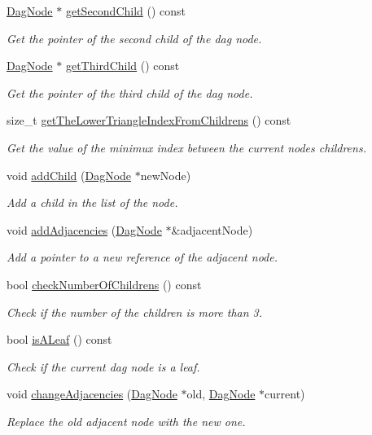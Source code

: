 \begin{DoxyCompactItemize}
\hyperlink{classDagNode}{Dag\+Node} $\ast$ \hyperlink{classDagNode_a301eaa7093739ce7892020a2a4c32cfd}{get\+Second\+Child} () const
\begin{DoxyCompactList}\small\item\em Get the pointer of the second child of the dag node. \end{DoxyCompactList}\item 
\hyperlink{classDagNode}{Dag\+Node} $\ast$ \hyperlink{classDagNode_a6a7af1fc33b66e3a22ebcf1b7da4f482}{get\+Third\+Child} () const
\begin{DoxyCompactList}\small\item\em Get the pointer of the third child of the dag node. \end{DoxyCompactList}\item 
size\+\_\+t \hyperlink{classDagNode_afd0111a6b8b906c0ac68914436f2db0d}{get\+The\+Lower\+Triangle\+Index\+From\+Childrens} () const
\begin{DoxyCompactList}\small\item\em Get the value of the minimux index between the current node\textquotesingle{}s childrens. \end{DoxyCompactList}\item 
void \hyperlink{classDagNode_addfd2cfc5237217967c418bf72fd7f3e}{add\+Child} (\hyperlink{classDagNode}{Dag\+Node} $\ast$new\+Node)
\begin{DoxyCompactList}\small\item\em Add a child in the list of the node. \end{DoxyCompactList}\item 
void \hyperlink{classDagNode_a106926f7429347b10746b66039b1609b}{add\+Adjacencies} (\hyperlink{classDagNode}{Dag\+Node} $\ast$\&adjacent\+Node)
\begin{DoxyCompactList}\small\item\em Add a pointer to a new reference of the adjacent node. \end{DoxyCompactList}\item 
bool \hyperlink{classDagNode_af23fe9b192f5a629d3badf2c93475d2b}{check\+Number\+Of\+Childrens} () const
\begin{DoxyCompactList}\small\item\em Check if the number of the children is more than 3. \end{DoxyCompactList}\item 
bool \hyperlink{classDagNode_af3ed3a5eed4cb9bf04ec6ad9b6877cce}{is\+A\+Leaf} () const
\begin{DoxyCompactList}\small\item\em Check if the current dag node is a leaf. \end{DoxyCompactList}\item 
void \hyperlink{classDagNode_a5f70b777657539694e124557fcd35be1}{change\+Adjacencies} (\hyperlink{classDagNode}{Dag\+Node} $\ast$old, \hyperlink{classDagNode}{Dag\+Node} $\ast$current)
\begin{DoxyCompactList}\small\item\em Replace the old adjacent node with the new one. \end{DoxyCompactList}\end{DoxyCompactItemize}

